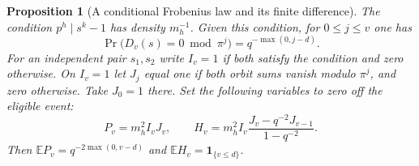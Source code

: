 \documentclass[a4paper,11pt]{article}
\newtheorem{proposition}{Proposition}[section]
\theoremstyle{definition}
\theoremstyle{remark}
\numberwithin{equation}{section}
\begin{document}
\begin{proposition}[A conditional Frobenius law and its finite difference]\leavevmode
\label{prop:law273}
The condition \(p^h\mid s^k-1\) has density \(m_h^{-1}\).
Given this condition, for \(0\le j\le v\) one has
\[
         \Pr\bigl(D_v(s)=0\bmod\pi^j\bigr)
                              = q^{-\max(0,j-d)} .
\]
For an independent pair \(s_1,s_2\) write \(I_v=1\) if
both satisfy the condition and zero otherwise. On \(I_v=1\)
let \(J_j\) equal one if both orbit sums vanish modulo
\(\pi^j\), and zero otherwise. Take \(J_0=1\) there. Set
the following variables to zero off the eligible event:
\[
     P_v=m_h^2 I_vJ_v,\qquad
     H_v=m_h^2 I_v\frac{J_v-q^{-2}J_{v-1}}{1-q^{-2}} .
\]
Then \(\mathbb E P_v=q^{-2\max(0,v-d)}\) and
\(\mathbb E H_v=\mathbf1_{\{v\le d\}}\).
\end{proposition}
\end{document}
